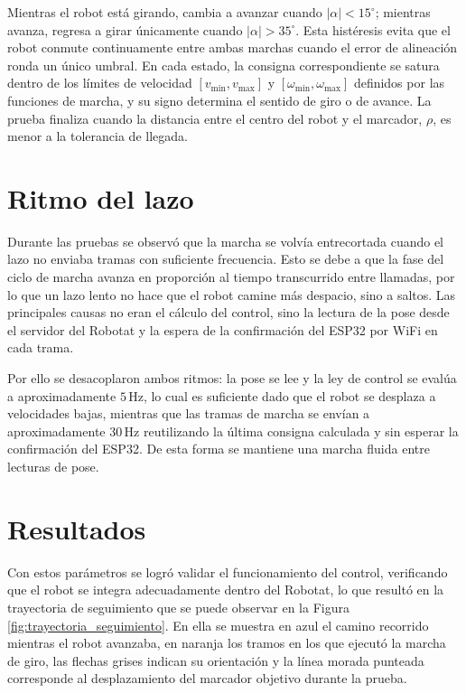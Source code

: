 Mientras el robot está girando, cambia a avanzar cuando $|\alpha| < 15^\circ$; mientras avanza, regresa a girar únicamente cuando $|\alpha| > 35^\circ$. Esta histéresis evita que el robot conmute continuamente entre ambas marchas cuando el error de alineación ronda un único umbral. En cada estado, la consigna correspondiente se satura dentro de los límites de velocidad $[v_{\min}, v_{\max}]$ y $[\omega_{\min}, \omega_{\max}]$ definidos por las funciones de marcha, y su signo determina el sentido de giro o de avance. La prueba finaliza cuando la distancia entre el centro del robot y el marcador, $\rho$, es menor a la tolerancia de llegada.

\section{Ritmo del lazo}

Durante las pruebas se observó que la marcha se volvía entrecortada cuando el lazo no enviaba tramas con suficiente frecuencia. Esto se debe a que la fase del ciclo de marcha avanza en proporción al tiempo transcurrido entre llamadas, por lo que un lazo lento no hace que el robot camine más despacio, sino a saltos. Las principales causas no eran el cálculo del control, sino la lectura de la pose desde el servidor del Robotat y la espera de la confirmación del ESP32 por WiFi en cada trama.

Por ello se desacoplaron ambos ritmos: la pose se lee y la ley de control se evalúa a aproximadamente $5\,\text{Hz}$, lo cual es suficiente dado que el robot se desplaza a velocidades bajas, mientras que las tramas de marcha se envían a aproximadamente $30\,\text{Hz}$ reutilizando la última consigna calculada y sin esperar la confirmación del ESP32. De esta forma se mantiene una marcha fluida entre lecturas de pose.

\section{Resultados}

Con estos parámetros se logró validar el funcionamiento del control, verificando que el robot se integra adecuadamente dentro del Robotat, lo que resultó en la trayectoria de seguimiento que se puede observar en la Figura \ref{fig:trayectoria_seguimiento}. En ella se muestra en azul el camino recorrido mientras el robot avanzaba, en naranja los tramos en los que ejecutó la marcha de giro, las flechas grises indican su orientación y la línea morada punteada corresponde al desplazamiento del marcador objetivo durante la prueba.

